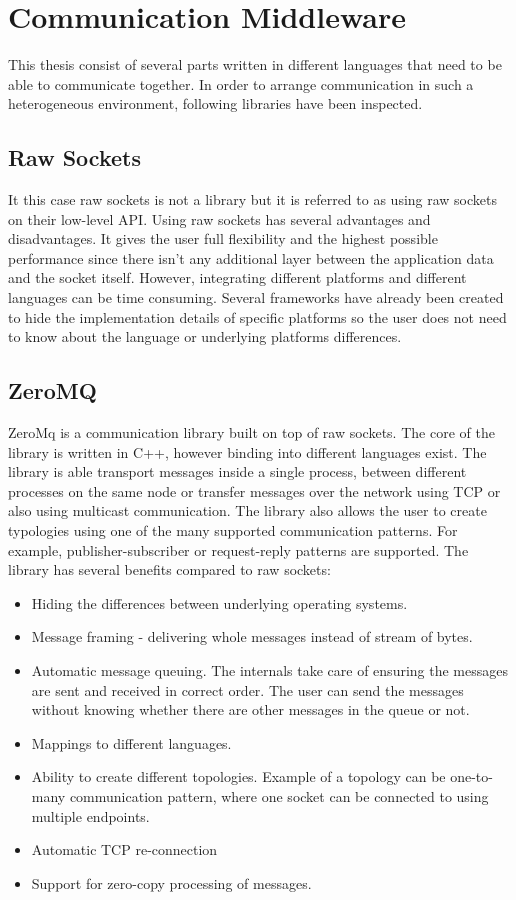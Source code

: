 \section{Communication Middleware}
This thesis consist of several parts written in different languages that need to be able to communicate together. In order to arrange communication in such a heterogeneous environment, following libraries have been inspected.
\subsection{Raw Sockets}
\label{raw_sockets}
It this case raw sockets is not a library but it is referred to as using raw sockets on their low-level API. Using raw sockets has several advantages and disadvantages. It gives the user full flexibility and the highest possible performance since there isn't any additional layer between the application data and the socket itself. However, integrating different platforms and different languages can be time consuming. Several frameworks have already been created to hide the implementation details of specific platforms so the user does not need to know about the language or underlying platforms differences.
\subsection{ZeroMQ}
\label{zeromq}
ZeroMq is a communication library built on top of raw sockets. The core of the library is written in C++, however binding into different languages exist. The library is able transport messages inside a single process, between different processes on the same node or transfer messages over the network using TCP or also using multicast communication. The library also allows the user to create typologies using one of the many supported communication patterns. For example, publisher-subscriber or request-reply patterns are supported. The library has several benefits compared to raw sockets:
\begin{itemize}
	\item Hiding the differences between underlying operating systems.
	\item Message framing - delivering whole messages instead of stream of bytes.
	\item Automatic message queuing. The internals take care of ensuring the messages are sent and received in correct order. The user can send the messages without knowing whether there are other messages in the queue or not.
	\item Mappings to different languages.
	\item Ability to create different topologies. Example of a topology can be one-to-many communication pattern, where one socket can be connected to using multiple endpoints. 
	\item Automatic TCP re-connection
	\item Support for zero-copy processing of messages.
\end{itemize}
